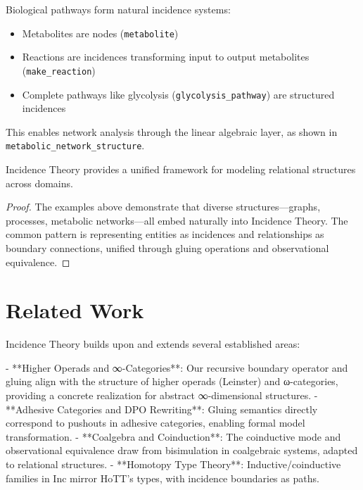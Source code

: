\documentclass{article}
\begin{document}
\begin{example}
\label{ex:metabolic-networks}
Biological pathways form natural incidence systems:

\begin{itemize}
\item Metabolites are nodes (\texttt{metabolite})
\item Reactions are incidences transforming input to output metabolites (\texttt{make\_reaction})
\item Complete pathways like glycolysis (\texttt{glycolysis\_pathway}) are structured incidences
\end{itemize}

This enables network analysis through the linear algebraic layer, as shown in \texttt{metabolic\_network\_structure}.
\end{example}

\begin{theorem}
\label{thm:universal-applicability}
Incidence Theory provides a unified framework for modeling relational structures across domains.
\end{theorem}

\begin{proof}
The examples above demonstrate that diverse structures—graphs, processes, metabolic networks—all embed naturally into Incidence Theory. The common pattern is representing entities as incidences and relationships as boundary connections, unified through gluing operations and observational equivalence.
\end{proof}

\section{Related Work}
Incidence Theory builds upon and extends several established areas:

- **Higher Operads and ∞-Categories**: Our recursive boundary operator and gluing align with the structure of higher operads (Leinster) and ω-categories, providing a concrete realization for abstract ∞-dimensional structures.
- **Adhesive Categories and DPO Rewriting**: Gluing semantics directly correspond to pushouts in adhesive categories, enabling formal model transformation.
- **Coalgebra and Coinduction**: The coinductive mode and observational equivalence draw from bisimulation in coalgebraic systems, adapted to relational structures.
- **Homotopy Type Theory**: Inductive/coinductive families in Inc mirror HoTT's types, with incidence boundaries as paths.
\end{document}
